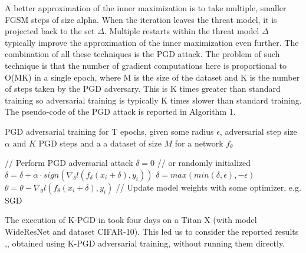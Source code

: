 \documentclass{article}
\begin{document}
A better approximation of the inner maximization is to take multiple, smaller FGSM steps of size alpha. When the iteration leaves the threat model, it is projected back to the set $\Delta$. Multiple restarts within the threat model $\Delta$ typically improve the approximation of the inner maximization even further. The combination of all these techniques is the PGD attack. The problem of such technique is that the number of gradient computations here is proportional to O(MK) in a single epoch, where M is the size of the dataset and K is the number of steps taken by the PGD adversary. This is K times greater than standard training so adversarial training is typically K times slower than standard training. The pseudo-code of the PGD attack is reported in Algorithm 1.
\begin{algorithm}[H]
	\caption{PGD adversarial training for T epochs, given some radius $\epsilon$, adversarial step size $\alpha$ and $K$ PGD steps and a a dataset of size $M$ for a network $f_{\theta}$}
	\begin{algorithmic}[1]
		\State// Perform PGD adversarial attack
		\State $\delta = 0$ // or randomly initialized
		\State $\delta = \delta + \alpha\cdot sign(\nabla_{\delta}l(f_{\delta}(x_i + \delta), y_i))$
		\State $\delta = max(min(\delta, \epsilon), -\epsilon)$
		\EndFor
		\State$\theta = \theta - \nabla_{\theta}l(f_{\theta}(x_i + \delta), y_i)$ // Update model weights with some optimizer, e.g. SGD
		\EndFor
		\EndFor
	\end{algorithmic}
\end{algorithm}
The execution of K-PGD in \cite{MadryEtAl2017} took four days on a Titan X (with model WideResNet and dataset CIFAR-10). This led us to consider the reported results \cite{ShafahiEtAl2019b},\cite{WongEtAl2020}, obtained using K-PGD adversarial training, without running them directly.
\end{document}
